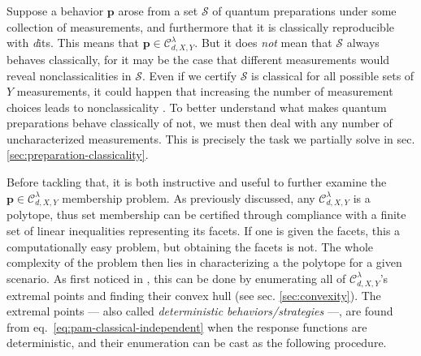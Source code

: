     Suppose a behavior $\mathbf{p}$ arose from a set $\mathcal{S}$ of quantum preparations under some collection of measurements, and furthermore that it is classically reproducible with \emph{d}its. This means that $\mathbf{p} \in \mathcal{C}_{d,X,Y}^\lambda$. But it does \emph{not} mean that $\mathcal{S}$ always behaves classically, for it may be the case that different measurements would reveal nonclassicalities in $\mathcal{S}$. Even if we certify $\mathcal{S}$ is classical for all possible sets of $Y$ measurements, it could happen that increasing the number of measurement choices leads to nonclassicality \cite{poderini_pamcriteria_2020}. To better understand what makes quantum preparations behave classically of not, we must then deal with any number of uncharacterized measurements. This is precisely the task we partially solve in sec. \ref{sec:preparation-classicality}. %

    Before tackling that, it is both instructive and useful to further examine the $\mathbf{p} \in \mathcal{C}_{d,X,Y}^\lambda$ membership problem. As previously discussed, any $\mathcal{C}_{d,X,Y}^\lambda$ is a polytope, thus set membership can be certified through compliance with a finite set of linear inequalities representing its facets. If one is given the facets, this a computationally easy problem, but obtaining the facets is not. The whole complexity of the problem then lies in characterizing a the polytope for a given scenario. As first noticed in \cite{gallego_pam_2010}, this can be done by enumerating all of $\mathcal{C}_{d,X,Y}^\lambda$'s extremal points and finding their convex hull (see sec. \ref{sec:convexity}). The extremal points --- also called \emph{deterministic behaviors/strategies} ---, are found from eq.~\eqref{eq:pam-classical-independent} when the response functions are deterministic, and their enumeration can be cast as the following procedure.

